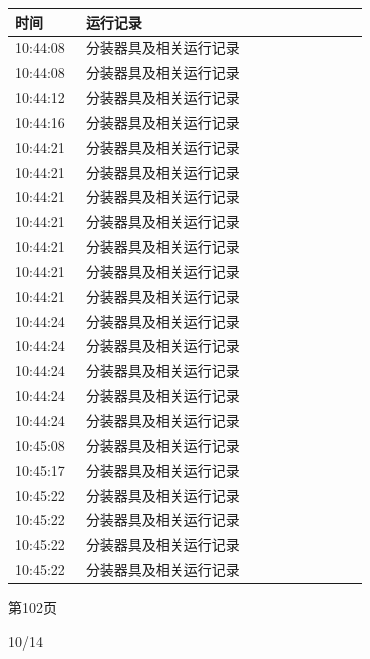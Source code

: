 \documentclass[UTF8,10pt,a4paper,fontset=fandol]{ctexart}
\newcommand{\handwritten}[1]{#1}
\begin{document}
\begin{center}
\begin{minipage}[t]{0.46\linewidth}
\vspace{4pt}
\begin{tabular}{|p{0.18\linewidth}|p{0.72\linewidth}|}
\hline
时间 & 运行记录 \\ \hline
10:44:08 & 分装器具及相关运行记录 \\ \hline
10:44:08 & 分装器具及相关运行记录 \\ \hline
10:44:12 & 分装器具及相关运行记录 \\ \hline
10:44:16 & 分装器具及相关运行记录 \\ \hline
10:44:21 & 分装器具及相关运行记录 \\ \hline
10:44:21 & 分装器具及相关运行记录 \\ \hline
10:44:21 & 分装器具及相关运行记录 \\ \hline
10:44:21 & 分装器具及相关运行记录 \\ \hline
10:44:21 & 分装器具及相关运行记录 \\ \hline
10:44:21 & 分装器具及相关运行记录 \\ \hline
10:44:21 & 分装器具及相关运行记录 \\ \hline
10:44:24 & 分装器具及相关运行记录 \\ \hline
10:44:24 & 分装器具及相关运行记录 \\ \hline
10:44:24 & 分装器具及相关运行记录 \\ \hline
10:44:24 & 分装器具及相关运行记录 \\ \hline
10:44:24 & 分装器具及相关运行记录 \\ \hline
10:45:08 & 分装器具及相关运行记录 \\ \hline
10:45:17 & 分装器具及相关运行记录 \\ \hline
10:45:22 & 分装器具及相关运行记录 \\ \hline
10:45:22 & 分装器具及相关运行记录 \\ \hline
10:45:22 & 分装器具及相关运行记录 \\ \hline
10:45:22 & 分装器具及相关运行记录 \\ \hline
\end{tabular}

\vspace{3pt}
第102页
\end{minipage}
\end{center}


\handwritten{10/14}
\end{document}
